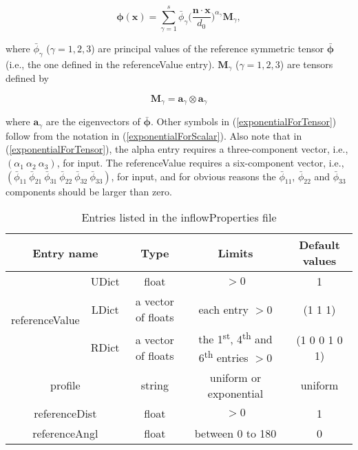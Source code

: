 \begin{equation} \label{exponentialForTensor}
\boldsymbol{\phi}(\boldsymbol{x}) = \sum_{\gamma=1}^s \bar{\phi}_{\gamma}\big(\frac{\boldsymbol{n}\cdot\boldsymbol{x}}{d_0}\big)^{\alpha_{\gamma}} \boldsymbol{M}_{\gamma},
\end{equation}

\noindent where $\bar{\phi}_{\gamma}$ ($\gamma=1,2,3$) are principal values of the reference symmetric tensor $\bar{\boldsymbol{\phi}}$ (i.e., the one defined in the \textcolor{mauve}{referenceValue} entry). $\boldsymbol{M}_{\gamma}$ ($\gamma=1,2,3$) are tensors defined by

\begin{equation}
\boldsymbol{M}_{\gamma} = \boldsymbol{a}_{\gamma} \otimes \boldsymbol{a}_{\gamma}
\end{equation}

\noindent where $\boldsymbol{a}_{\gamma}$ are the eigenvectors of $\bar{\boldsymbol{\phi}}$. Other symbols in (\ref{exponentialForTensor}) follow from the notation in (\ref{exponentialForScalar}). Also note that in (\ref{exponentialForTensor}), the \textcolor{mauve}{alpha} entry requires a three-component vector, i.e., $(\alpha_1 \ \alpha_2 \ \alpha_3)$, for input. The \textcolor{mauve}{referenceValue} requires a six-component vector, i.e., $(\bar{\phi}_{11} \ \bar{\phi}_{21} \ \bar{\phi}_{31}\ \bar{\phi}_{22} \ \bar{\phi}_{32}\ \bar{\phi}_{33})$, for input, and for obvious reasons the $\bar{\phi}_{11}$, $\bar{\phi}_{22}$ and $\bar{\phi}_{33}$ components should be larger than zero.


\begin{table}[H]
\centering
\begin{tabular}{c|c|c|c|c}
\hline
\multicolumn{2}{c|}{Entry name} & Type & Limits & Default values \\
\hline
\multirow{3}{*}{referenceValue} & UDict & float & $>0$ & 1 \\
\cline{2-5}
& LDict &  a vector of floats & each entry $>0$ & (1 1 1)\\
\cline{2-5}
& RDict & a vector of floats & the 1\textsuperscript{st}, 4\textsuperscript{th} and 6\textsuperscript{th} entries $>0$  & (1 0 0 1 0 1)\\
\hline
\multicolumn{2}{c|}{profile} & string & uniform or exponential & uniform \\
\hline
\multicolumn{2}{c|}{referenceDist} & float & $>0$ & 1 \\
\hline
\multicolumn{2}{c|}{referenceAngl} & float & between 0 to 180 & 0 \\
\hline
\end{tabular} \caption{Entries listed in the \textcolor{mauve}{inflowProperties} file}\label{entryInflow}
\end{table}